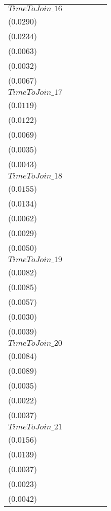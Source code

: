 \begin{tabular}{llllll}
$TimeToJoin\_16$  &     \makecell{$0.0393^{}$ \\ ($0.0290$)} &     \makecell{$0.0320^{}$ \\ ($0.0234$)} &   \makecell{$-0.0127^{**}$ \\ ($0.0063$)} &  \makecell{$-0.0098^{***}$ \\ ($0.0032$)} &    \makecell{$0.0111^{*}$ \\ ($0.0067$)} \\
$TimeToJoin\_17$  &     \makecell{$0.0139^{}$ \\ ($0.0119$)} &     \makecell{$0.0139^{}$ \\ ($0.0122$)} &   \makecell{$-0.0148^{**}$ \\ ($0.0069$)} &  \makecell{$-0.0116^{***}$ \\ ($0.0035$)} &     \makecell{$0.0069^{}$ \\ ($0.0043$)} \\
$TimeToJoin\_18$  &    \makecell{$0.0263^{*}$ \\ ($0.0155$)} &     \makecell{$0.0210^{}$ \\ ($0.0134$)} &  \makecell{$-0.0160^{***}$ \\ ($0.0062$)} &  \makecell{$-0.0117^{***}$ \\ ($0.0029$)} &    \makecell{$0.0086^{*}$ \\ ($0.0050$)} \\
$TimeToJoin\_19$  &   \makecell{$0.0189^{**}$ \\ ($0.0082$)} &   \makecell{$0.0167^{**}$ \\ ($0.0085$)} &  \makecell{$-0.0154^{***}$ \\ ($0.0057$)} &  \makecell{$-0.0112^{***}$ \\ ($0.0030$)} &     \makecell{$0.0058^{}$ \\ ($0.0039$)} \\
$TimeToJoin\_20$  &     \makecell{$0.0092^{}$ \\ ($0.0084$)} &     \makecell{$0.0090^{}$ \\ ($0.0089$)} &  \makecell{$-0.0193^{***}$ \\ ($0.0035$)} &  \makecell{$-0.0141^{***}$ \\ ($0.0022$)} &    \makecell{$0.0063^{*}$ \\ ($0.0037$)} \\
$TimeToJoin\_21$  &     \makecell{$0.0089^{}$ \\ ($0.0156$)} &     \makecell{$0.0076^{}$ \\ ($0.0139$)} &  \makecell{$-0.0156^{***}$ \\ ($0.0037$)} &  \makecell{$-0.0121^{***}$ \\ ($0.0023$)} &     \makecell{$0.0057^{}$ \\ ($0.0042$)} \\

\end{tabular}
